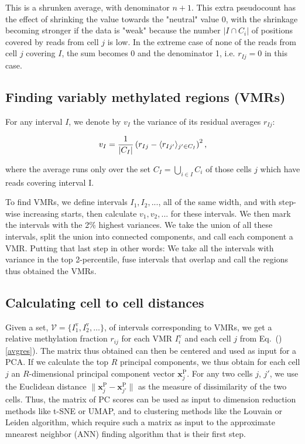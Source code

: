 \documentclass[twocolumn,10pt]{article}
\begin{document}
This is a shrunken average, with denominator $n+1$. This extra pseudocount has the effect of shrinking the value towards the "neutral" value 0, with the shrinkage becoming stronger if the data is "weak" because the number $|I\cap C_i|$ of positions covered by reads from cell $j$  is low. In the extreme case of none of the reads from cell $j$ covering $I$, the sum becomes 0 and the denominator 1, i.e. $r_{Ij}=0$ in this case.

\subsection{Finding variably methylated regions (VMRs)}

For any interval $I$, we denote by $v_I$ the variance of its residual averages $r_{Ij}$:

$$ v_I = \frac{\scriptsize{1}}{\scriptsize{|C_I|}}\left( r_{Ij} - \langle r_{Ij'}\rangle_{j'\in C_I} \right)^2,$$

where the average runs only over the set $C_I=\bigcup_{i\in I}C_i$ of those cells $j$ which have reads covering interval I.

To find VMRs, we define intervals $I_1, I_2, ...$, all of the same width, and with step-wise increasing starts, then calculate $v_1, v_2, ...$ for these intervals. We then mark the intervals with the 2\% highest variances. We take the union of all these intervals, split the union into connected components, and call each component a VMR. Putting that last step in other words: We take all the intervals with variance in the top 2-percentile, fuse intervals that overlap and call the regions thus obtained the VMRs.

\subsection{Calculating cell to cell distances}

Given a set, $\mathcal{V}=\{I^\text{v}_1,I^\text{v}_2,\dots\}$, of intervals corresponding to VMRs, we get a relative methylation fraction $r_{ij}$ for each VMR $I^\text{v}_i$ and each cell $j$ from Eq.\ ()\ref{avgres}). The matrix thus obtained can then be centered and used as input for a PCA. If we calculate the top $R$ principal components, we thus obtain for each cell $j$ an $R$-dimensional principal component vector $\mathbf{x}^\text{P}_j$. For any two cells $j$, $j'$, we use the Euclidean distance $\|\mathbf{x}^\text{P}_j - \mathbf{x}^\text{P}_{j'}\|$ as the measure of dissimilarity of the two cells.
Thus, the matrix of PC scores can be used as input to dimension reduction methods like t-SNE or UMAP, and to clustering methods like the Louvain or Leiden algorithm, which require such a matrix as input to the approximate mnearest neighbor (ANN) finding algorithm that is their first step.
\end{document}
